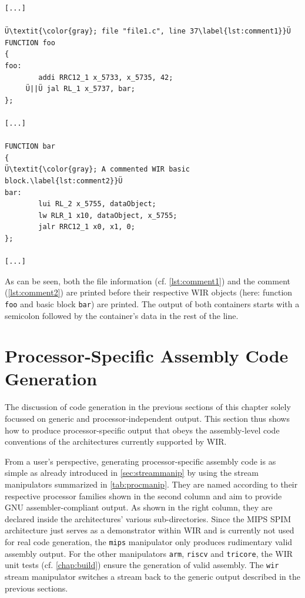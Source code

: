 \begin{lstlisting}[style=commandline,float=!h]
[...]

Ü\textit{\color{gray}; file "file1.c", line 37\label{lst:comment1}}Ü
FUNCTION foo
{
foo:
        addi RRC12_1 x_5733, x_5735, 42;
     Ü||Ü jal RL_1 x_5737, bar;
};

[...]

FUNCTION bar
{
Ü\textit{\color{gray}; A commented WIR basic block.\label{lst:comment2}}Ü
bar:
        lui RL_2 x_5755, dataObject;
        lw RLR_1 x10, dataObject, x_5755;
        jalr RRC12_1 x0, x1, 0;
};

[...]
\end{lstlisting}

As can be seen, both the file information (cf. \cref{lst:comment1}) and the comment (\cref{lst:comment2}) are printed before their respective \gls{WIR} objects (here: function \texttt{foo} and basic block \texttt{bar}) are printed.
The output of both containers starts with a semicolon followed by the container's data in the rest of the line.


\section{Processor-Specific Assembly Code Generation}
\label{sec:asmcode}

The discussion of code generation in the previous sections of this chapter solely focussed on generic and processor-independent output.
This section thus shows how to produce processor-specific output that obeys the assembly-level code conventions of the architectures currently supported by \gls{WIR}.

From a user's perspective, generating processor-specific assembly code is as simple as already introduced in \cref{sec:streammanip} by using the stream manipulators summarized in \cref{tab:procmanip}.
They are named according to their respective processor families shown in the second column and aim to provide GNU assembler-compliant output.
As shown in the right column, they are declared inside the architectures' various sub-directories.
Since the MIPS SPIM architecture just serves as a demonstrator within \gls{WIR} and is currently not used for real code generation, the \texttt{mips} manipulator only produces rudimentary valid assembly output.
For the other manipulators \texttt{arm}, \texttt{riscv} and \texttt{tricore}, the \gls{WIR} unit tests (cf. \cref{chap:build}) ensure the generation of valid assembly.
The \texttt{wir} stream manipulator switches a stream back to the generic output described in the previous sections.

